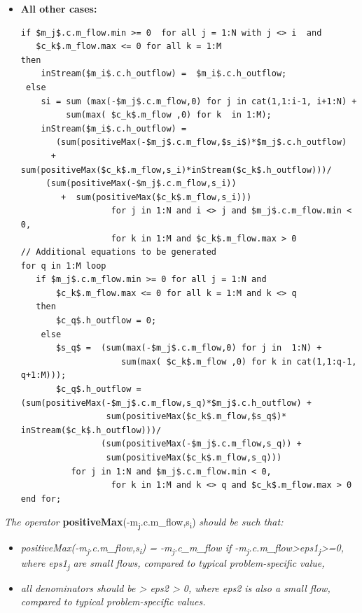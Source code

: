 \documentclass[10pt,a4paper]{report}
\renewcommand{\newline}{\hspace*{\fill}\raggedright\linebreak}
\renewcommand{\newline}{\hspace*{\fill}\linebreak}
\begin{document}
\begin{itemize}
\item\textbf{All other cases:}\newline
\begin{lstlisting}[language=modelica,mathescape=true]
if $m_j$.c.m_flow.min >= 0  for all j = 1:N with j <> i  and  
   $c_k$.m_flow.max <= 0 for all k = 1:M
then 
    inStream($m_i$.c.h_outflow) =  $m_i$.c.h_outflow;
 else 
    si = sum (max(-$m_j$.c.m_flow,0) for j in cat(1,1:i-1, i+1:N) + 
         sum(max( $c_k$.m_flow ,0) for k  in 1:M);
    inStream($m_i$.c.h_outflow) = 
       (sum(positiveMax(-$m_j$.c.m_flow,$s_i$)*$m_j$.c.h_outflow)
      +  sum(positiveMax($c_k$.m_flow,s_i)*inStream($c_k$.h_outflow)))/ 
     (sum(positiveMax(-$m_j$.c.m_flow,s_i))
        +  sum(positiveMax($c_k$.m_flow,s_i)))  
                  for j in 1:N and i <> j and $m_j$.c.m_flow.min < 0, 
                  for k in 1:M and $c_k$.m_flow.max > 0
// Additional equations to be generated
for q in 1:M loop
   if $m_j$.c.m_flow.min >= 0 for all j = 1:N and 
       $c_k$.m_flow.max <= 0 for all k = 1:M and k <> q
   then
       $c_q$.h_outflow = 0;
    else
       $s_q$ =  (sum(max(-$m_j$.c.m_flow,0) for j in  1:N) +
                    sum(max( $c_k$.m_flow ,0) for k in cat(1,1:q-1, q+1:M)));
       $c_q$.h_outflow = (sum(positiveMax(-$m_j$.c.m_flow,s_q)*$m_j$.c.h_outflow) +
                 sum(positiveMax($c_k$.m_flow,$s_q$)* inStream($c_k$.h_outflow)))/
                (sum(positiveMax(-$m_j$.c.m_flow,s_q)) +
                 sum(positiveMax($c_k$.m_flow,s_q)))  
		  for j in 1:N and $m_j$.c.m_flow.min < 0,
                  for k in 1:M and k <> q and $c_k$.m_flow.max > 0
end for;
\end{lstlisting}
\end{itemize}
\emph{The operator}
\textbf{positiveMax}(-m\textsubscript{j}.c.m\_flow,s\textsubscript{i})
\emph{should be such that:}

\begin{itemize}
\item
  \emph{positiveMax(-m\textsubscript{j}.c.m\_flow,s\textsubscript{i}) =
  -m\textsubscript{j}.c\_m\_flow if
  -m\textsubscript{j}.c.m\_flow\textgreater{}eps1\textsubscript{j}\textgreater{}=0,
  where eps1\textsubscript{j} are small flows, compared to typical
  problem-specific value,}
\item
  \emph{all denominators should be \textgreater{} eps2 \textgreater{} 0,
  where eps2 is also a small flow, compared to typical problem-specific
  values.}
\end{itemize}
\end{document}
